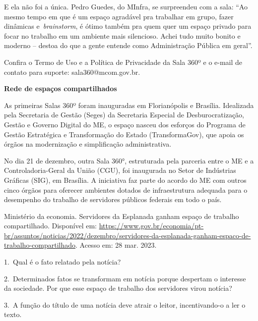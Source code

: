 \begin{itemize}
\begin{itemize}
{\begin{itemize}
E ela não foi a única. Pedro Guedes, do MInfra, se surpreendeu com a
sala: ``Ao mesmo tempo em que é um espaço agradável pra trabalhar em
grupo, fazer dinâmicas e~\emph{brainstorm}, é ótimo também pra quem quer
um espaço privado para focar no trabalho em um ambiente mais silencioso.
Achei tudo muito bonito e moderno -- destoa do que a gente entende como
Administração Pública em geral''.

Confira o Termo de Uso e a Política de Privacidade da Sala 360º e o e-mail de contato
para
suporte: sala360@mcom.gov.br.

\textbf{Rede de espaços compartilhados}

As primeiras Salas 360º foram inauguradas em Florianópolis e Brasília.
Idealizada pela Secretaria de Gestão (Seges) da Secretaria Especial de
Desburocratização, Gestão e Governo Digital do ME, o espaço nasceu dos
esforços do Programa de Gestão Estratégica e Transformação do Estado
(TransformaGov), que apoia os órgãos na modernização e simplificação
administrativa.

No dia 21 de dezembro, outra Sala 360°, estruturada pela parceria entre
o ME e a Controladoria-Geral da União (CGU), foi inaugurada no Setor de
Indústrias Gráficas (SIG), em Brasília. A iniciativa faz parte do acordo
do ME com outros cinco órgãos para oferecer ambientes dotados de
infraestrutura adequada para o desempenho do trabalho de servidores
públicos federais em todo o país.

Ministério da economia. Servidores da Esplanada ganham espaço de
trabalho compartilhado. Disponível em:
\url{https://www.gov.br/economia/pt-br/assuntos/noticias/2022/dezembro/servidores-da-esplanada-ganham-espaco-de-trabalho-compartilhado}.
Acesso em: 28 mar. 2023.

1.~Qual é o fato relatado pela notícia?



2.~Determinados fatos se transformam em notícia porque despertam o
interesse da sociedade. Por que esse espaço de trabalho dos servidores
virou notícia?



3.~A função do título de uma notícia deve atrair o leitor,
incentivando-o a ler o texto.


\end{itemize}}
\end{itemize}
\end{itemize}
